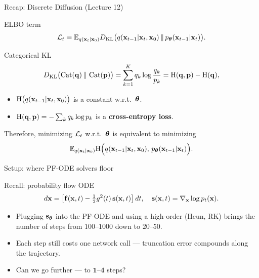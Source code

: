 \documentclass{beamer}
\renewcommand{\eqpause}{}
\renewcommand{\nextonslide}[1]{#1}
\begin{document}
\begin{frame}{Recap: Discrete Diffusion (Lecture 12)}

	\begin{block}{ELBO term}
		\vspace{-0.3cm}
		\[
			\mathcal{L}_t
			= \mathbb{E}_{q(\mathbf{x}_t | \mathbf{x}_0)}
			D_\mathrm{KL}\bigl(q(\mathbf{x}_{t-1} | \mathbf{x}_t, \mathbf{x}_0) \,\|\, p_{\boldsymbol{\theta}}(\mathbf{x}_{t-1} | \mathbf{x}_t)\bigr).
		\]
		\vspace{-0.3cm}
	\end{block}
	\begin{block}{Categorical KL}
		\vspace{-0.3cm}
		\[
			D_\mathrm{KL}\bigl(\operatorname{Cat}(\mathbf{q}) \,\|\, \operatorname{Cat}(\mathbf{p})\bigr)
			= \sum_{k=1}^K q_k \log \frac{q_k}{p_k}
			= \mathrm{H}(\mathbf{q},\mathbf{p}) - \mathrm{H}(\mathbf{q}),
		\]
		\begin{itemize}
			\item $\mathrm{H}\bigl(q(\mathbf{x}_{t-1} | \mathbf{x}_t, \mathbf{x}_0)\bigr)$ is a constant w.r.t.~$\boldsymbol{\theta}$.
			\item $\mathrm{H}(\mathbf{q},\mathbf{p}) = -\sum_k q_k \log p_k$ is a \textbf{cross-entropy loss}.
		\end{itemize}
	\end{block}
	Therefore, minimizing $\mathcal{L}_t$ w.r.t.~$\boldsymbol{\theta}$ is equivalent to minimizing
	\[
		\mathbb{E}_{q(\mathbf{x}_t | \mathbf{x}_0)}
		\mathrm{H}\Bigl(q(\mathbf{x}_{t-1} | \mathbf{x}_t, \mathbf{x}_0),\, p_{\boldsymbol{\theta}}(\mathbf{x}_{t-1} | \mathbf{x}_t)\Bigr).
	\]
\end{frame}
\begin{frame}{Setup: where PF-ODE solvers floor}
	\begin{block}{Recall: probability flow ODE}
		\vspace{-0.3cm}
		\[
			d\mathbf{x} = \left[\mathbf{f}(\mathbf{x}, t) - \tfrac{1}{2} g^2(t)\, \mathbf{s}(\mathbf{x}, t)\right] dt, \quad \mathbf{s}(\mathbf{x}, t) = \nabla_{\mathbf{x}} \log p_t(\mathbf{x}).
		\]
	\end{block}
	\eqpause
	\begin{itemize}
		\item Plugging $\mathbf{s}_{\boldsymbol{\theta}}$ into the PF-ODE and using a high-order \ODESolve (Heun, RK) brings the number of steps from $100$--$1000$ down to $20$--$50$.
		\nextonslide{\item Each step still costs one network call --- truncation error compounds along the trajectory.}
		\nextonslide{\item Can we go further --- to $\mathbf{1}$--$\mathbf{4}$ steps?}
	\end{itemize}
\end{frame}
\end{document}

